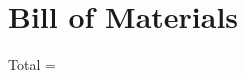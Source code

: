 \documentclass[../main]{subfiles}
\begin{document}
\chapter{Bill of Materials} \label{chp:}

%

\def\BOMCurrentTotal{0}

\def\BOMDUSystemTotal{0}
\def\BOMGrandTotal{0}
\def\BOMTmp{0}
\def\BOMTest{0}





















Total = \theBOMGrandTotal

%
%
\end{document}
